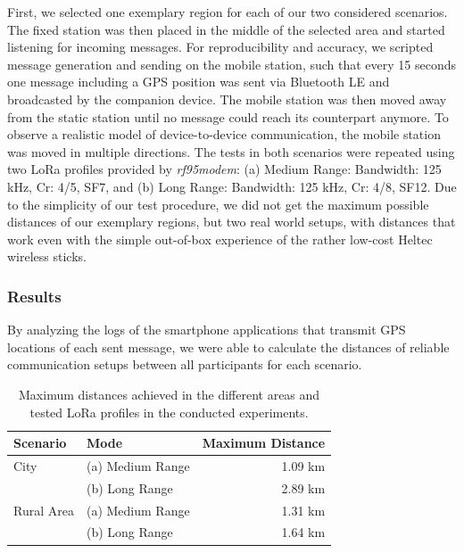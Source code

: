 First, we selected one exemplary region for each of our two considered scenarios. 
The fixed station was then placed in the middle of the selected area and started listening for incoming messages.
For reproducibility and accuracy, we scripted message generation and sending on the mobile station, such that every 15 seconds one message including a GPS position was sent via Bluetooth LE and broadcasted by the companion device.
The mobile station was then moved away from the static station until no message could reach its counterpart anymore.
To observe a realistic model of device-to-device communication, the mobile station was moved in multiple directions.
The tests in both scenarios were repeated using two LoRa  profiles provided by \textit{rf95modem}: (a) Medium Range: Bandwidth: 125 kHz, Cr: 4/5, SF7, and (b) Long Range: Bandwidth: 125 kHz, Cr: 4/8, SF12.
Due to the simplicity of our test procedure, we did not get the maximum possible distances of our exemplary regions, but two real world setups, with distances that work even with the simple out-of-box experience of the rather low-cost Heltec wireless sticks.

\subsubsection{Results}

By analyzing the logs of the smartphone applications that transmit GPS locations of each sent message, we were able to calculate the distances of reliable communication setups between all participants for each scenario.

\begin{table}[ht!]
    \centering
    \begin{tabular}{llr}
        \toprule
        \textbf{Scenario}    & \textbf{Mode}          & \textbf{Maximum Distance} \\
        \midrule
        City        & (a) Medium Range  &  1.09 km \\
        & (b) Long Range    &  2.89 km \\
        Rural Area  & (a) Medium Range  &  1.31 km \\
        & (b) Long Range   &  1.64 km \\
        \bottomrule
    \end{tabular}
    \caption{Maximum distances achieved in the different areas and tested LoRa profiles in the conducted experiments.}
    \label{hoechst2020lora:tab:max_dist}
\end{table}

